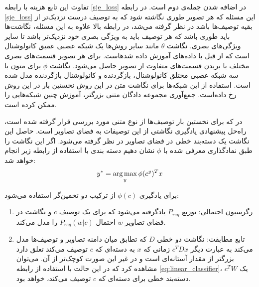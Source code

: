 تفاوت این تابع هزینه با  رابطه \eqref{sje_loss} در اضافه شدن جمله‌ی دوم است. در  رابطه \eqref{sje_loss} این مسئله که هر تصویر طوری نگاشته شود که به توصیف درست نزدیک‌تر از بقیه توصیف‌ها باشد در نظر گرفته می‌شد، در رابطه بالا علاوه به این مسئله، نگاشت‌ها باید طوری باشد که هر توصیف باید به ويژگی بصری خود نزدیک‌تر باشد تا سایر ویژگی‌های بصری.
نگاشت $\theta$ مانند سایر روش‌ها یک شبکه عصبی عمیق کانولوشنال است که از قبل با داده‌های  آموزش داده شدهاست. برای هر تصویر قسمت‌های بصری مختلف با بریدن قسمت‌های متفاوت از تصویر حاصل می‌شود. نگاشت $\phi$ برای متون با سه شبکه عصبی مختلق کانولوشنال، بازگردنده و کانولوشنال بازگردنده مدل شده است. استفاده از این شبکه‌ها برای نگاشت متن در این روش نخستین بار در این روش رخ داده‌است. جمع‌آوری مجموعه دادگان متنی بزرگتر، آموزش چنین شبکه‌هایی را ممکن کرده است.

در  \cite{mohamed13} که برای نخستین بار توصیف‌ها از نوع متنی مورد بررسی قرار گرفته شده است، راه‌حل پیشنهادی یادگیری نگاشتی از این توصیفات به فضای تصاویر است. حاصل این نگاشت یک دسته‌بند خطی در فضای تصاویر در نظر گرفته می‌شود. اگر این نگاشت را طبق نمادگذاری معرفی شده با $\phi$ نشان دهیم دسته بندی با استفاده از رابطه زیر انجام خواهد شد:
\begin{equation} \label{eq:linear_classifier}
y^* = \operatorname*{arg\,max}_y \phi(c^y)^T x
\end{equation}


برای یادگیری $\phi(c)$ از ترکیب دو تخمین‌گر استفاده می‌شود:
\begin{enumerate}
\item
رگرسیون احتمالی: توزیع $P_{reg}$ یادگرفته می‌شود که برای یک توصیف $c$ و نگاشت در فضای تصاویر $w$ احتمال $P_{reg}(w|c)$ را مدل می‌کند.
\item
تابع مطابقت: نگاشت دو خطی $D$ که تطابق میان دامنه تصاویر و توصیف‌ها مدل می‌کند به عبارت دیگر $c^TDx$ زمانی که $x$ به دسته‌ای که   $c$ توصیف می‌کند تعلق دارد بزرگتر از مقدار آستانه‌ای است و در غیر این صورت کوچک‌تر از آن. می‌توان مشاهده کرد که در این حالت با استفاده از رابطه
\eqref{eq:linear_classifier}،
 $c^TW$
یک  دسته‌بند خطی برای دسته‌ای که $c$ توصیف می‌کند، خواهد بود.
\end{enumerate}

